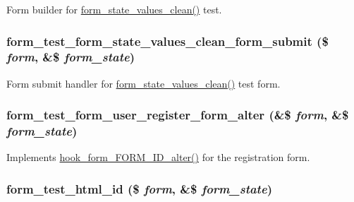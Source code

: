 \label{form__test_8module_ae4876c1eeb47a238a8069cb7f4e5e3f2}
Form builder for \hyperlink{group__form__api_ga012a73101cc9e2bfbb9e9a41c4e0a723}{form\_\-state\_\-values\_\-clean()} test. \hypertarget{form__test_8module_acb2effd72a8a3d77d6491d2cde76b273}{
\subsubsection[{form\_\-test\_\-form\_\-state\_\-values\_\-clean\_\-form\_\-submit}]{\setlength{\rightskip}{0pt plus 5cm}form\_\-test\_\-form\_\-state\_\-values\_\-clean\_\-form\_\-submit (\$ {\em form}, \/  \&\$ {\em form\_\-state})}}
\label{form__test_8module_acb2effd72a8a3d77d6491d2cde76b273}
Form submit handler for \hyperlink{group__form__api_ga012a73101cc9e2bfbb9e9a41c4e0a723}{form\_\-state\_\-values\_\-clean()} test form. \hypertarget{form__test_8module_a600ce05cfaa9fd8d5f93a89f50778457}{
\subsubsection[{form\_\-test\_\-form\_\-user\_\-register\_\-form\_\-alter}]{\setlength{\rightskip}{0pt plus 5cm}form\_\-test\_\-form\_\-user\_\-register\_\-form\_\-alter (\&\$ {\em form}, \/  \&\$ {\em form\_\-state})}}
\label{form__test_8module_a600ce05cfaa9fd8d5f93a89f50778457}
Implements \hyperlink{group__hooks_ga8d4a4089551493d55911bd5c4f218264}{hook\_\-form\_\-FORM\_\-ID\_\-alter()} for the registration form. \hypertarget{form__test_8module_a020b67fab9b34897837b3adee33f35aa}{
\subsubsection[{form\_\-test\_\-html\_\-id}]{\setlength{\rightskip}{0pt plus 5cm}form\_\-test\_\-html\_\-id (\$ {\em form}, \/  \&\$ {\em form\_\-state})}}
